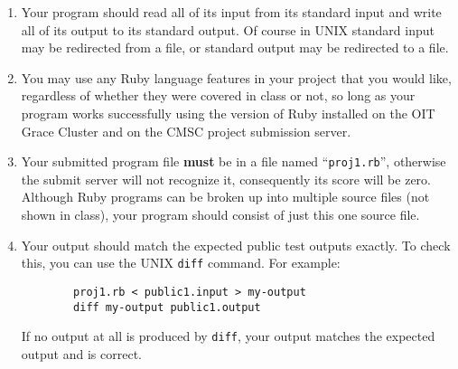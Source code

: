 \documentclass[11pt]{article}
\begin{document}
    \begin{enumerate}

      \addtolength{\itemsep}{-1mm}

      \item Your program should read all of its input from its standard input
            and write all of its output to its standard output.  Of course in
            UNIX standard input may be redirected from a file, or standard
            output may be redirected to a file.

      \item You may use any Ruby language features in your project that you
            would like, regardless of whether they were covered in class or
            not, so long as your program works successfully using the
            version of Ruby installed on the OIT Grace Cluster and on the
            CMSC project submission server.

      \item Your submitted program file \textbf{must} be in a file named
            ``\texttt{proj1.rb}'', otherwise the submit server will not
            recognize it, consequently its score will be zero.  Although
            Ruby programs can be broken up into multiple source files (not
            shown in class), your program should consist of just this one
            source file.

      \item Your output should match the expected public test outputs
            exactly.  To check this, you can use the UNIX \texttt{diff}
            command.  For example:

            \begin{centering}

              \begin{BVerbatim}
        proj1.rb < public1.input > my-output
        diff my-output public1.output
              \end{BVerbatim}

            \end{centering}

            If no output at all is produced by \texttt{diff}, your output
            matches the expected output and is correct.



\end{enumerate}
\end{document}
